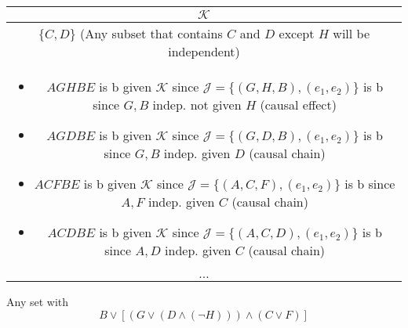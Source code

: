 \begin{example}
    \begin{center}
        \begin{tabular}{c}
            \toprule
            $\mathcal{K}$ \\
            \midrule
            $\{C,D\}$ (Any subset that contains $C$ and $D$ except $H$ will be independent) \\
            \multicolumn{1}{p{\linewidth}}{
                \begin{itemize}
                    \item $AGHBE$ is b given $\mathcal{K}$ since $\mathcal{J} = \{(G,H,B),(e_1,e_2)\}$ is b since $G,B$ indep. not given $H$ (causal effect)
                    \item $AGDBE$ is b given $\mathcal{K}$ since $\mathcal{J} = \{(G,D,B),(e_1,e_2)\}$ is b since $G,B$ indep. given $D$ (causal chain)
                    \item $ACFBE$ is b given $\mathcal{K}$ since $\mathcal{J} = \{(A,C,F),(e_1,e_2)\}$ is b since $A,F$ indep. given $C$ (causal chain)
                    \item $ACDBE$ is b given $\mathcal{K}$ since $\mathcal{J} = \{(A,C,D),(e_1,e_2)\}$ is b since $A,D$ indep. given $C$ (causal chain)
                \end{itemize}} \\
            \midrule
            $\ldots$ \\
            \toprule
        \end{tabular}
    \end{center}
\end{example}

\begin{example}
    Any set with 
    \begin{equation*}
        B \lor [(G \lor (D \land (\lnot H))) \land (C \lor F)]
    \end{equation*}
\end{example}
\newpage

\begin{example}
    
\end{example}

